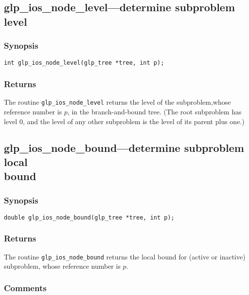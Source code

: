 \subsection{glp\_ios\_node\_level---determine subproblem level}

\subsubsection*{Synopsis}

\begin{verbatim}
int glp_ios_node_level(glp_tree *tree, int p);
\end{verbatim}

\subsubsection*{Returns}

The routine \verb|glp_ios_node_level| returns the level of the
subproblem,\linebreak whose reference number is $p$, in the
branch-and-bound tree. (The root subproblem has level 0, and the level
of any other subproblem is the level of its parent plus one.)

\subsection{glp\_ios\_node\_bound---determine subproblem local\\bound}

\subsubsection*{Synopsis}

\begin{verbatim}
double glp_ios_node_bound(glp_tree *tree, int p);
\end{verbatim}

\subsubsection*{Returns}

The routine \verb|glp_ios_node_bound| returns the local bound for
(active or inactive) subproblem, whose reference number is $p$.

\subsubsection*{Comments}

